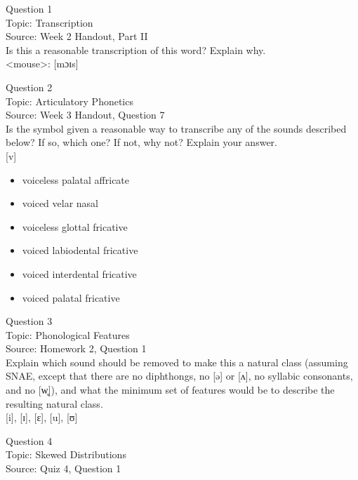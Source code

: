 \documentclass[12pt]{article}
\begin{document}
{\large Question 1}\\

Topic: Transcription\\
Source: Week 2 Handout, Part II\\

Is this a reasonable transcription of this word? Explain why.\\

<mouse>: {[mɔɪs]}


\newpage

{\large Question 2}\\

Topic: Articulatory Phonetics\\
Source: Week 3 Handout, Question 7\\

Is the symbol given a reasonable way to transcribe any of the sounds described below? If so, which one? If not, why not? Explain your answer.\\

{[v]}

\begin{itemize} \item voiceless palatal affricate \item voiced velar nasal \item voiceless glottal fricative \item voiced labiodental fricative \item voiced interdental fricative \item voiced palatal fricative \end{itemize}


\newpage

{\large Question 3}\\

Topic: Phonological Features\\
Source: Homework 2, Question 1\\

Explain which sound should be removed to make this a natural class (assuming SNAE, except that there are no diphthongs, no [ə] or [ʌ], no syllabic consonants, and no [w̥]), and what the minimum set of features would be to describe the resulting natural class.\\

{[i]}, {[ɪ]}, {[ɛ]}, {[u]}, {[ʊ]}


\newpage

{\large Question 4}\\

Topic: Skewed Distributions\\
Source: Quiz 4, Question 1\\
\end{document}
